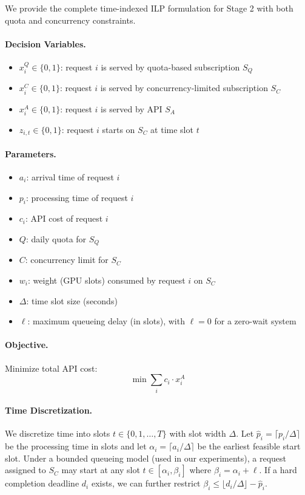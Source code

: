 We provide the complete time-indexed ILP formulation for Stage 2 with both quota and concurrency constraints.

\paragraph{Decision Variables.}
\begin{itemize}
    \item $x_i^Q \in \{0, 1\}$: request $i$ is served by quota-based subscription $S_Q$
    \item $x_i^C \in \{0, 1\}$: request $i$ is served by concurrency-limited subscription $S_C$
    \item $x_i^A \in \{0, 1\}$: request $i$ is served by API $S_A$
    \item $z_{i,t} \in \{0, 1\}$: request $i$ starts on $S_C$ at time slot $t$
\end{itemize}

\paragraph{Parameters.}
\begin{itemize}
    \item $a_i$: arrival time of request $i$
    \item $p_i$: processing time of request $i$
    \item $c_i$: API cost of request $i$
    \item $Q$: daily quota for $S_Q$
    \item $C$: concurrency limit for $S_C$
    \item $w_i$: weight (GPU slots) consumed by request $i$ on $S_C$
    \item $\Delta$: time slot size (seconds)
    \item $\ell$: maximum queueing delay (in slots), with $\ell=0$ for a zero-wait system
\end{itemize}

\paragraph{Objective.} Minimize total API cost:
\[
\min \sum_{i} c_i \cdot x_i^A
\]

\paragraph{Time Discretization.}
We discretize time into slots $t \in \{0, 1, \dots, T\}$ with slot width $\Delta$. Let
$\hat{p}_i = \lceil p_i/\Delta \rceil$ be the processing time in slots and let
$\alpha_i = \lceil a_i/\Delta \rceil$ be the earliest feasible start slot. Under a bounded
queueing model (used in our experiments), a request assigned to $S_C$ may start at any slot
$t \in [\alpha_i, \beta_i]$ where $\beta_i = \alpha_i + \ell$. If a hard completion deadline
$d_i$ exists, we can further restrict $\beta_i \le \lfloor d_i/\Delta \rfloor - \hat{p}_i$.

